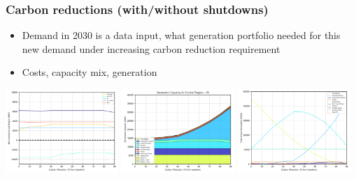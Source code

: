 \documentclass[xcolor=dvipsnames]{beamer}
\begin{document}
\begin{frame}
  \frametitle{Carbon reductions (with/without shutdowns)}

\begin{itemize}
  \item Demand in 2030 is a data input, what generation portfolio
    needed for this new demand under increasing carbon reduction requirement
  \item Costs, capacity mix,  generation
\end{itemize}

  \includegraphics[width=0.32\textwidth]{includes/no_leakage_no_shutdowns_agg_exim.png}
  \includegraphics[width=0.32\textwidth]{includes/no_leakage_no_shutdowns_agg_capacity_cntlreg.png}
  \includegraphics[width=0.32\textwidth]{includes/no_leakage_no_shutdowns_agg_generation_cntlreg.png}


\end{frame}
\end{document}
